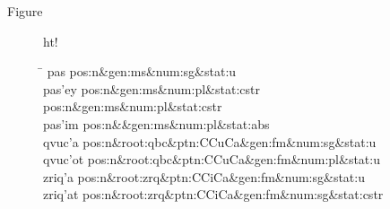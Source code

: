 Figure~
\begin{figure}{ht!}
\begin{mdframed}
\begin{tabbing}
\hspace{1in} \= \hspace{5.5in} \kill
pas \> pos:n\&gen:ms\&num:sg\&stat:u\\
pas\a'{e}y \> pos:n\&gen:ms\&num:pl\&stat:cstr pos:n\&gen:ms\&num:pl\&stat:cstr\\
pas\a'{i}m \> pos:n\&\&gen:ms\&num:pl\&stat:abs\\
qvuc\a'{a} \> pos:n\&root:qbc\&ptn:CCuCa\&gen:fm\&num:sg\&stat:u\\
qvuc\a'{o}t \> pos:n\&root:qbc\&ptn:CCuCa\&gen:fm\&num:pl\&stat:u \\
zriq\a'{a} \> pos:n\&root:zrq\&ptn:CCiCa\&gen:fm\&num:sg\&stat:u \\
zriq\a'{a}t	 \> pos:n\&root:zrq\&ptn:CCiCa\&gen:fm\&num:sg\&stat:cstr \\

\end{tabbing}
\end{mdframed}
\end{figure}
